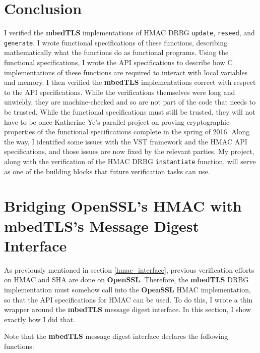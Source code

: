 \documentclass[pageno]{jpaper}
\newcommand{\stdtitle}[1]{\textbf{#1}}
\begin{document}
\section{Conclusion}

I verified the \stdtitle{mbedTLS} implementations of HMAC DRBG \lstinline{update}, \lstinline{reseed}, and \lstinline{generate}. I wrote functional specifications of these functions, describing mathematically what the functions do as functional programs. Using the functional specifications, I wrote the API specifications to describe how C implementations of these functions are required to interact with local variables and memory. I then verified the \stdtitle{mbedTLS} implementations correct with respect to the API specifications. While the verifications themselves were long and unwieldy, they are machine-checked and so are not part of the code that needs to be trusted. While the functional specifications must still be trusted, they will not have to be once Katherine Ye’s parallel project on proving cryptographic properties of the functional specifications complete in the spring of 2016. Along the way, I identified some issues with the VST framework and the HMAC API specifications, and those issues are now fixed by the relevant parties. My project, along with the verification of the HMAC DRBG \lstinline{instantiate} function, will serve as one of the building blocks that future verification tasks can use.




\clearpage
\appendix
\appendixpage
\section{Bridging OpenSSL’s HMAC with mbedTLS’s Message Digest Interface} \label{appendix_hmac}

As previously mentioned in section \ref{hmac_interface}, previous verification efforts on HMAC and SHA are done on \stdtitle{OpenSSL}. Therefore, the \stdtitle{mbedTLS} DRBG implementation must somehow call into the \stdtitle{OpenSSL} HMAC implementation, so that the API specifications for HMAC can be used. To do this, I wrote a thin wrapper around the \stdtitle{mbedTLS} message digest interface. In this section, I show exactly how I did that.

Note that the \stdtitle{mbedTLS} message digest interface declares the following functions:
\end{document}

